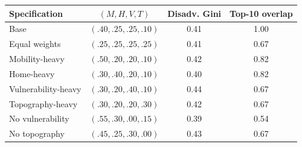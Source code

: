 \begin{tabular}{@{}lccc@{}}
\toprule
Specification & $(M,H,V,T)$ & Disadv. Gini & Top-10 overlap \\
\midrule
Base & $(.40,.25,.25,.10)$ & 0.41 & 1.00 \\
Equal weights & $(.25,.25,.25,.25)$ & 0.41 & 0.67 \\
Mobility-heavy & $(.50,.20,.20,.10)$ & 0.42 & 0.82 \\
Home-heavy & $(.30,.40,.20,.10)$ & 0.40 & 0.82 \\
Vulnerability-heavy & $(.30,.20,.40,.10)$ & 0.44 & 0.67 \\
Topography-heavy & $(.30,.20,.20,.30)$ & 0.42 & 0.67 \\
No vulnerability & $(.55,.30,.00,.15)$ & 0.39 & 0.54 \\
No topography & $(.45,.25,.30,.00)$ & 0.43 & 0.67 \\
\bottomrule
\end{tabular}
